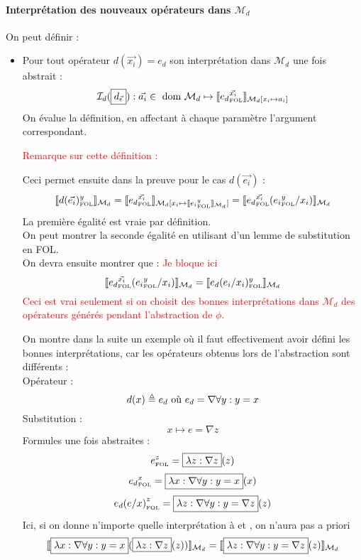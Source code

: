 \documentclass[12pt]{article}
\newcommand{\FOL}{\ensuremath{\textup{\tiny{}FOL}}}
\newcommand{\M}{\ensuremath{\mathcal{M}}}
\newcommand{\raph}[1]{\textcolor{red}{#1}}
\begin{document}
\paragraph{Interprétation des nouveaux opérateurs dans $\mathcal{M}_d$}
On peut définir :
\begin{itemize}
\item
  Pour tout opérateur $d(\vec{x_i}) = e_d$ son interprétation dans $\mathcal{M}_d$ une fois abstrait :
  \[
    \mathcal{I}_d(\framebox{$d_{\vec{\epsilon}}$}) : \vec{a_i} \in \textup{ dom } \mathcal{M}_d \mapsto
    \llbracket {e_d}_\FOL^{\vec{x_i}} \rrbracket_{\mathcal{M}_d[x_i \mapsto a_i]}
  \]
  On évalue la définition, en affectant à chaque paramètre l'argument correspondant.

  \raph{Remarque sur cette définition :}
  
  Ceci permet ensuite dans la preuve pour le cas $d(\vec{e_i})$ :
  \[
    \llbracket d(\vec{e_i})_\FOL^y \rrbracket_{\mathcal{M}_d} =
    \llbracket {e_d}_\FOL^{\vec{x_i}} \rrbracket_{\mathcal{M}_d[x_i \mapsto \llbracket {e_i}_\FOL^y \rrbracket_{\mathcal{M}_d} ]} =
    \llbracket {e_d}_\FOL^{\vec{x_i}} ({e_i}_\FOL^y/{x_i}) \rrbracket_{\mathcal{M}_d}
  \]
  La première égalité est vraie par définition.\\
  On peut montrer la seconde égalité en utilisant d'un lemme de substitution en FOL.\\
  On devra ensuite montrer que : \raph{ Je bloque ici }
  \[
    \llbracket {e_d}_\FOL^{\vec{x_i}} ({e_i}_\FOL^y/{x_i}) \rrbracket_{\mathcal{M}_d} =
    \llbracket {e_d(e_i/x_i)_\FOL^y} \rrbracket_{\mathcal{M}_d}
  \]
  \raph{Ceci est vrai seulement si on choisit des bonnes interprétations dans $\M_d$ des opérateurs générés pendant l'abstraction de $\phi$.}

  On montre dans la suite un exemple où il faut effectivement avoir défini les bonnes interprétations, car les opérateurs obtenus lors de l'abstraction sont différents : \\
  Opérateur :
  \[ d(x) \triangleq e_d \textup{ où } e_d = \nabla \forall y : y = x \]
  Substitution :
  \[ x \mapsto e = \nabla z \]
  Formules une fois abstraites :
  \[ e_\FOL^z = \framebox{$\lambda z : \nabla z$}(z) \]
  \[ {e_d}_\FOL^x = \framebox{$\lambda x : \nabla \forall y : y = x$}(x) \]
  \[ {e_d(e/x)}_\FOL^z = \framebox{$\lambda z : \nabla \forall y : y = \nabla z$}(z) \]
  Ici, si on donne n'importe quelle interprétation à  et , on n'aura pas a priori
  \[
    \llbracket \framebox{$\lambda x : \nabla \forall y : y = x$}(\framebox{$\lambda z : \nabla z$}(z)) \rrbracket_{\M_d}
    =
    \llbracket \framebox{$\lambda z : \nabla \forall y : y = \nabla z$}(z) \rrbracket_{\M_d}
  \]
\end{itemize}
\end{document}
